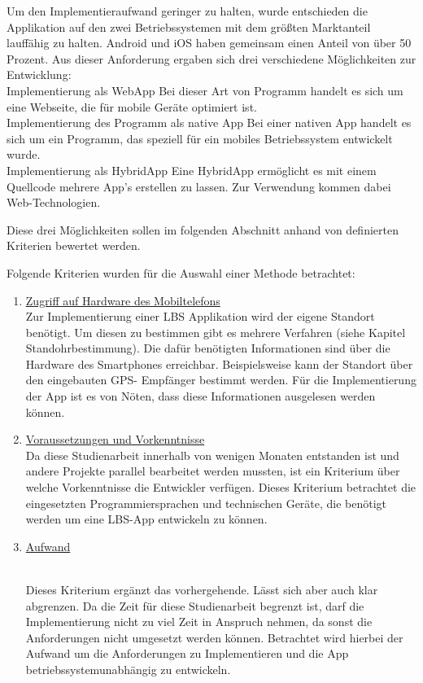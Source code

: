 Um den Implementieraufwand geringer zu halten, wurde entschieden die Applikation auf den zwei Betriebssystemen mit dem größten Marktanteil lauffähig zu halten. 
Android und iOS haben gemeinsam einen Anteil von über 50 Prozent. Aus dieser 
Anforderung ergaben sich drei verschiedene Möglichkeiten zur Entwicklung:
\\Implementierung als WebApp
Bei dieser Art von Programm handelt es sich um eine Webseite, die für mobile 
Geräte optimiert ist.
\\Implementierung des Programm als native App
Bei einer nativen App handelt es sich um ein Programm, das speziell für ein mobiles Betriebssystem entwickelt wurde.
\\Implementierung als HybridApp
Eine HybridApp ermöglicht es mit einem Quellcode mehrere App's erstellen zu lassen. 
Zur Verwendung kommen dabei Web-Technologien.

Diese drei Möglichkeiten sollen im folgenden Abschnitt anhand von definierten 
Kriterien bewertet werden.


Folgende Kriterien wurden für die Auswahl einer Methode betrachtet:
\begin{enumerate}
\item \underline{Zugriff auf Hardware des Mobiltelefons}
\\Zur Implementierung einer LBS Applikation wird der eigene Standort benötigt. Um 
diesen zu bestimmen gibt es mehrere Verfahren (siehe Kapitel Standohrbestimmung). 
Die dafür benötigten Informationen sind über die Hardware des 
Smartphones erreichbar. Beispielsweise kann der Standort über den eingebauten GPS-
Empfänger bestimmt werden. Für die Implementierung der App ist es von Nöten, dass 
diese Informationen ausgelesen werden können.

\item \underline{Voraussetzungen und Vorkenntnisse}
\\Da diese Studienarbeit innerhalb von wenigen Monaten entstanden ist und andere Projekte 
parallel bearbeitet werden mussten, ist ein Kriterium über welche Vorkenntnisse die 
Entwickler verfügen. Dieses Kriterium betrachtet die eingesetzten 
Programmiersprachen und technischen Geräte, die benötigt werden um eine LBS-App 
entwickeln zu können.


\item \underline{Aufwand}

\\Dieses Kriterium ergänzt das vorhergehende. Lässt sich aber auch klar abgrenzen. Da die Zeit für diese Studienarbeit begrenzt ist, darf die Implementierung nicht zu 
viel Zeit in Anspruch nehmen, da sonst die Anforderungen nicht umgesetzt werden 
können. Betrachtet wird hierbei der Aufwand um die Anforderungen zu 
Implementieren und die App betriebssystemunabhängig zu entwickeln.
\end{enumerate}

